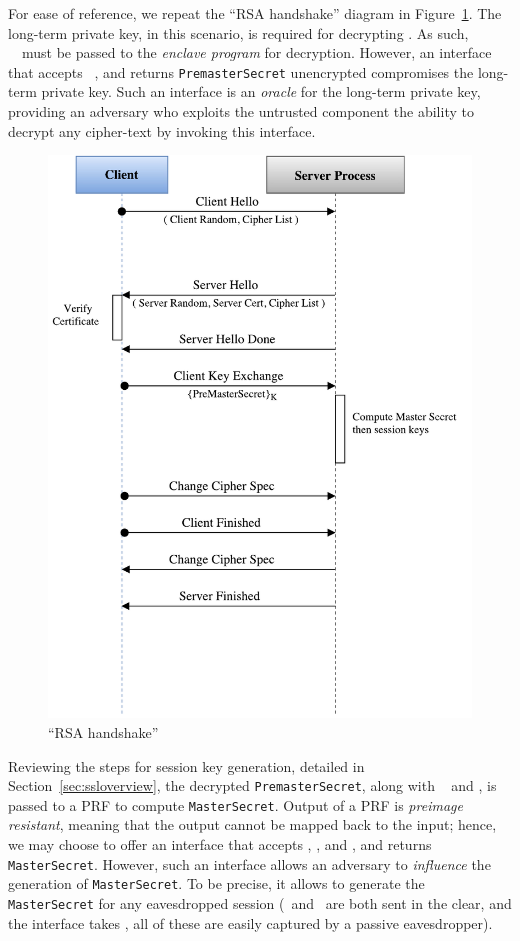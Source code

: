 \documentclass[../../main.tex]{subfiles}
\begin{document}
For ease of reference, we repeat the ``RSA handshake'' diagram in
Figure~\ref{fig:rsa-handshake-repeat}. The long-term private key, in
this scenario, is required for decrypting \premaster. As such,
~\premaster~must be passed to the \textit{enclave program} for
decryption. However, an interface that accepts ~\premaster, and
returns \texttt{PremasterSecret} unencrypted compromises the long-term
private key. Such an interface is an \textit{oracle} for the long-term
private key, providing an adversary who exploits the untrusted
component the ability to decrypt any cipher-text by invoking this
interface.

\begin{figure}[H]
  \centering
  \includegraphics[scale=0.4]{images/rsa-handshake-pristine.pdf}
  \caption{``RSA handshake''}
  \label{fig:rsa-handshake-repeat}
\end{figure}

Reviewing the steps for session key generation, detailed in
Section~\ref{sec:ssloverview}, the decrypted \texttt{PremasterSecret},
along with \crandom~ and \srandom, is passed to a PRF to compute
\texttt{MasterSecret}. Output of a PRF is \textit{preimage resistant},
meaning that the output cannot be mapped back to the input; hence, we
may choose to offer an interface that accepts \crandom, \srandom, and
\premaster, and returns \texttt{MasterSecret}. However, such an
interface allows an adversary to \textit{influence} the generation of
\texttt{MasterSecret}. To be precise, it allows to generate the
\texttt{MasterSecret} for any eavesdropped session (\srandom~and
\crandom~are both sent in the clear, and the interface takes
\premaster, all of these are easily captured by a passive
eavesdropper).
\end{document}
